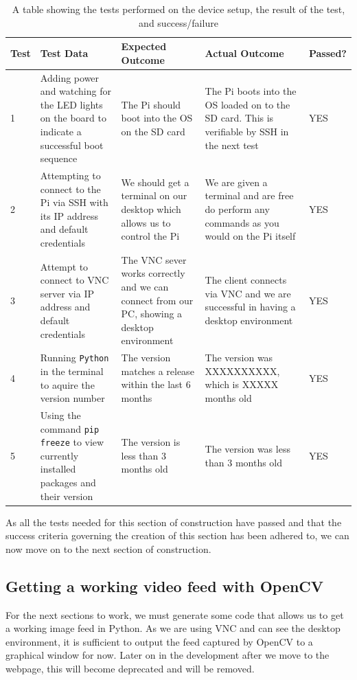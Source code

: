 \documentclass[9pt]{article}
\begin{document}
\begin{table}[H]
	\centering
	\begin{tabularx}{\textwidth}{lXXXl}
		\textbf{Test} & \textbf{Test Data}                                                                               & \textbf{Expected Outcome}                                                 & \textbf{Actual Outcome}                                                                       & \textbf{Passed?} \\ \midrule
		1             & Adding power and watching for the LED lights on the board to indicate a successful boot sequence & The Pi should boot into the OS on the SD card                             & The Pi boots into the OS loaded on to the SD card. This is verifiable by SSH in the next test & YES              \\
		2             & Attempting to connect to the Pi via SSH with its IP address and default credentials            & We should get a terminal on our desktop which allows us to control the Pi & We are given a terminal and are free do perform any commands as you would on the Pi itself    & YES              \\
		3             & Attempt to connect to VNC server via IP address and default credentials & The VNC sever works correctly and we can connect from our PC, showing a desktop environment
& The client connects via VNC and we are successful in having a desktop environment & YES \\
		4             & Running \texttt{Python} in the terminal to aquire the version number & The version matches a release within the last 6 months & The version was XXXXXXXXXX, which is XXXXX months old & YES \\
		5             & Using the command \texttt{pip freeze} to view currently installed packages and their version & The version is less than 3 months old & The version was less than 3 months old & YES \\ \bottomrule
	\end{tabularx}
	\caption{A table showing the tests performed on the device setup, the result of the test, and success/failure}
	\label{tab_deviceSetupTesting}
\end{table}
As all the tests needed for this section of construction have passed and that the success criteria governing the creation of this section has been adhered to, we can now move on to the next section of construction.


\newpage
\subsection{Getting a working video feed with OpenCV}
For the next sections to work, we must generate some code that allows us to get a working image feed in Python. As we are using VNC and can see the desktop environment, it is sufficient to output the feed captured by OpenCV to a graphical window for now. Later on in the development after we move to the webpage, this will become deprecated and will be removed.
\end{document}
